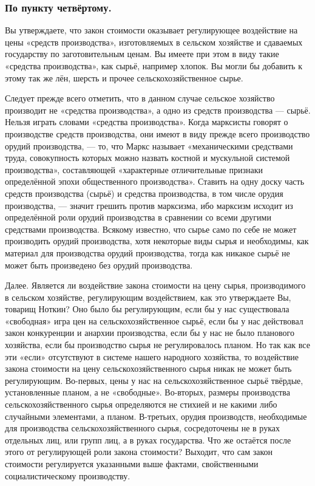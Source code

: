 \documentclass[12pt, a4paper, openany]{book}
\begin{document}
\subsubsection*{По пункту четвёртому.}





Вы утверждаете, что закон стоимости оказывает регулирующее воздействие на цены «средств производства», изготовляемых в сельском хозяйстве и сдаваемых государству по заготовительным ценам. Вы имеете при этом в виду такие «средства производства», как сырьё, например хлопок. Вы могли бы добавить к этому так же лён, шерсть и прочее сельскохозяйственное сырье.



Следует прежде всего отметить, что в данном случае сельское хозяйство производит не «средства производства», а одно из средств производства — сырьё. Нельзя играть словами «средства производства». Когда марксисты говорят о производстве средств производства, они имеют в виду прежде всего производство орудий производства, — то, что Маркс называет «механическими средствами труда, совокупность которых можно назвать костной и мускульной системой производства», составляющей «характерные отличительные признаки определённой эпохи общественного производства». Ставить на одну доску часть средств производства (сырьё) и средства производства, в том числе орудия производства, — значит грешить против марксизма, ибо марксизм исходит из определённой роли орудий производства в сравнении со всеми другими средствами производства. Всякому известно, что сырье само по себе не может производить орудий производства, хотя некоторые виды сырья и необходимы, как материал для производства орудий производства, тогда как никакое сырьё не может быть произведено без орудий производства.



Далее. Является ли воздействие закона стоимости на цену сырья, производимого в сельском хозяйстве, регулирующим воздействием, как это утверждаете Вы, товарищ Ноткин? Оно было бы регулирующим, если бы у нас существовала «свободная» игра цен на сельскохозяйственное сырьё, если бы у нас действовал закон конкуренции и анархии производства, если бы у нас не было планового хозяйства, если бы производство сырья не регулировалось планом. Но так как все эти «если» отсутствуют в системе нашего народного хозяйства, то воздействие закона стоимости на цену сельскохозяйственного сырья никак не может быть регулирующим. Во-первых, цены у нас на сельскохозяйственное сырьё твёрдые, установленные планом, а не «свободные». Во-вторых, размеры производства сельскохозяйственного сырья определяются не стихией и не какими либо случайными элементами, а планом. В-третьих, орудия производств, необходимые для производства сельскохозяйственного сырья, сосредоточены не в руках отдельных лиц, или групп лиц, а в руках государства. Что же остаётся после этого от регулирующей роли закона стоимости? Выходит, что сам закон стоимости регулируется указанными выше фактами, свойственными социалистическому производству.
\end{document}
